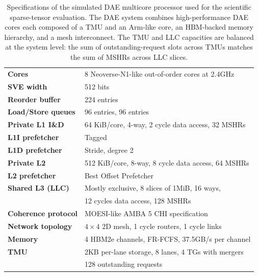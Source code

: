 \begin{table}
\centering
\caption[Specifications of the simulated DAE multicore for scientific workloads.]{Specifications of the simulated DAE multicore processor used for the scientific sparse-tensor evaluation. The DAE system combines high-performance DAE cores each composed of a TMU and an Arm-like core, an HBM-backed memory hierarchy, and a mesh interconnect. The TMU and LLC capacities are balanced at the system level: the sum of outstanding-request slots across TMUs matches the sum of MSHRs across LLC slices.}
    \begin{tabular}{@{}ll@{}}
    \toprule
    \textbf{Cores} & 8 Neoverse-N1-like out-of-order cores at 2.4GHz\\
    \textbf{SVE width} & 512 bits \\
    \textbf{Reorder buffer} & 224 entries \\
    \textbf{Load/Store queues} & 96 entries, 96 entries \\
    \midrule
    \textbf{Private L1 I\&D} & 64 KiB/core, 4-way, 2 cycle data access, 32 MSHRs \\
    \textbf{L1I prefetcher} & Tagged \\
    \textbf{L1D prefetcher} & Stride, degree 2 \\
    \textbf{Private L2}     & 512 KiB/core, 8-way, 8 cycle data access, 64 MSHRs \\
    \textbf{L2 prefetcher}  & Best Offset Prefetcher \\
    \textbf{Shared L3 (LLC)} & Mostly exclusive, 8 slices of 1MiB, 16 ways, \\
       & 12 cycles data access, 128 MSHRs \\
    \midrule
    \textbf{Coherence protocol} & MOESI-like AMBA 5 CHI specification \\%
    \textbf{Network topology} & $4\times4$ 2D mesh, 1 cycle routers, 1 cycle links\\
    \midrule
    \textbf{Memory} & 4 HBM2e channels, FR-FCFS, 37.5GB/s per channel\\
    \midrule
    \textbf{TMU} & 2KB per-lane storage, 8 lanes, 4 TGs with mergers\\
        & 128 outstanding requests \\    
    \bottomrule
    \end{tabular}
\label{tab:tmu-dae-system-specs}
\end{table}
